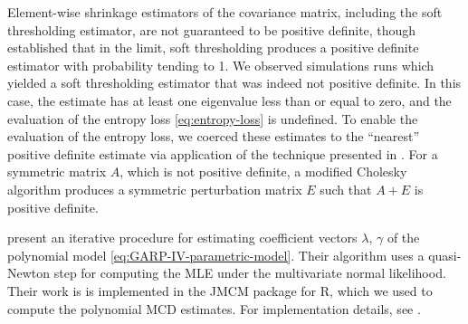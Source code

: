 \bigskip

Element-wise shrinkage estimators of the covariance matrix, including the soft thresholding estimator, are not guaranteed to be positive definite, though \citet{rothman2009generalized} established that in the limit, soft thresholding produces a positive definite estimator with probability tending to 1.  We observed simulations runs which yielded a soft thresholding estimator that was indeed not positive definite.   In this case, the estimate has at least one eigenvalue less than or equal to zero, and the evaluation of the entropy loss \ref{eq:entropy-loss} is undefined. To enable the evaluation of the entropy loss, we coerced these estimates to the ``nearest'' positive definite estimate via application of the technique presented in \citet{cheng1998modified}.  For a symmetric matrix $A$, which is not positive definite,  a modified Cholesky algorithm produces a symmetric perturbation matrix $E$ such that $A + E$ is positive definite.

\bigskip

\citet{pan2003modelling} present an iterative procedure for estimating coefficient vectors $\lambda$, $\gamma$ of the polynomial model \ref{eq:GARP-IV-parametric-model}. Their algorithm uses a quasi-Newton step for computing the MLE under the multivariate normal likelihood. Their work is  is implemented in the JMCM package for \textsf{R}, which we used to compute the polynomial MCD estimates.  For implementation details, see \citet{pan2017jmcm}. 	 

{}

\bigskip
